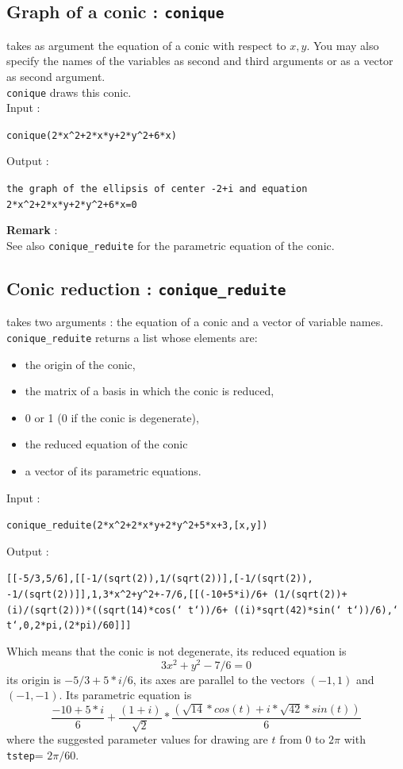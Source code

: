 \documentclass[a4paper,11pt]{book}
\begin{document}
\subsection{Graph of a conic : {\tt conique}}
 takes as argument the equation of a conic with
respect to $x,y$. You may also specify the names of the variables as
second and third arguments or as a vector as second argument.\\ 
{\tt conique} draws this conic.\\
Input :
\begin{center}{\tt conique(2*x\verb|^|2+2*x*y+2*y\verb|^|2+6*x)}\end{center}
Output :
\begin{center}{\tt the graph of the ellipsis of center -2+i and equation 2*x\verb|^|2+2*x*y+2*y\verb|^|2+6*x=0}\end{center}
{\bf Remark} :\\
See also {\tt conique\_reduite} for the parametric equation of the conic.

\subsection{Conic reduction : {\tt conique\_reduite}}
 takes two arguments : the equation of a conic
and a vector of variable names.\\ 
{\tt conique\_reduite} returns a list whose elements are:
\begin{itemize}
\item the origin of the conic,
\item the matrix of a basis in which the conic is reduced, 
\item 0 or 1 (0 if the conic is degenerate), 
\item the reduced equation of the conic 
\item a vector of its parametric equations.
\end{itemize}  
Input :
\begin{center}{\tt conique\_reduite(2*x\verb|^|2+2*x*y+2*y\verb|^|2+5*x+3,[x,y])}\end{center}
Output :
\begin{center}{\tt [[-5/3,5/6],[[-1/(sqrt(2)),1/(sqrt(2))],[-1/(sqrt(2)), -1/(sqrt(2))]],1,3*x\verb|^|2+y\verb|^|2+-7/6,[[(-10+5*i)/6+ (1/(sqrt(2))+(i)/(sqrt(2)))*((sqrt(14)*cos(`~t`))/6+ ((i)*sqrt(42)*sin(` t`))/6),` t`,0,2*pi,(2*pi)/60]]]}\end{center}
Which means that the conic is not degenerate, its reduced equation is 
\[3x^2+y^2-7/6=0 \] 
its origin is $-5/3+5*i/6$, its axes are
parallel to the vectors $(-1,1)$ and $(-1,-1)$.
Its parametric equation is
\[ \displaystyle \frac{-10+5*i}{6}+
\frac{(1+i)}{\sqrt 2}*\frac{(\sqrt{14}*cos(t)+i*\sqrt{42}*sin(t))}{6}
\]
where the suggested parameter values for drawing are
$t$ from 0 to $2\pi$ with {\tt tstep}= $2\pi/60$.
\end{document}
